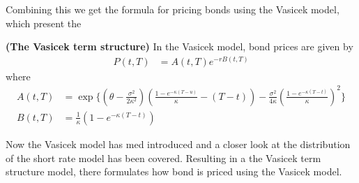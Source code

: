  Combining this we get the formula for pricing bonds using the Vasicek model, which present the 
\begin{proposition}
    \textbf{(The Vasicek term structure)} In the Vasicek model, bond prices are given by
 \begin{align}
    P(t,T) &= A(t,T) e^{-rB(t,T)} 
\end{align}
where
\begin{align*}
    A(t,T)&= \exp \Biggl\{\left(\theta-\frac{\sigma^2}{2 \kappa^2}\right)\left(\frac{1-e^{-\kappa(T-u)}}{\kappa}-(T-t)\right)
    -\frac{\sigma^2}{4 \kappa}\left(\frac{1-e^{-\kappa(T-t)}}{\kappa}\right)^2 \Biggr\} \\
    B(t,T) & =\frac{1}{\kappa} \left( 1 - e^{-\kappa (T-t)} \right)  
\end{align*}
\cite{Bjork}
\end{proposition}
\noindent
Now the Vasicek model has med introduced and a closer look at the distribution of the short rate model has been 
covered. Resulting in a the Vasicek term structure model, there formulates how bond is priced using the Vasicek model. 



